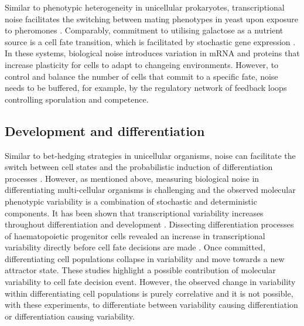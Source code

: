 Similar to phenotypic heterogeneity in unicellular prokaryotes, transcriptional noise facilitates the switching between mating phenotypes in yeast upon exposure to pheromones \citep{Paliwal2007}. 
Comparably, commitment to utilising galactose as a nutrient source is a cell fate transition, which is facilitated by stochastic gene expression \cite{Acar2008}. \\

In these systems, biological noise introduces variation in mRNA and proteins that increase plasticity for cells to adapt to changeing environments.
However, to control and balance the number of cells that commit to a specific fate, noise needs to be buffered, for example, by the regulatory network of feedback loops controlling sporulation and competence.

\subsection{Development and differentiation}

Similar to bet-hedging strategies in unicellular organisms, noise can facilitate the switch between cell states and the probabilistic induction of differentiation processes \citep{Eldar2010, Chang2008}.
However, as mentioned above, measuring biological noise in differentiating multi-cellular organisms is challenging and the observed molecular phenotypic variability is a combination of stochastic and deterministic components.
It has been shown that transcriptional variability increases throughout differentiation \citep{Stumpf2017} and development \citep{Antolovic2017}. 
Dissecting differentiation processes of haematopoietic progenitor cells revealed an increase in transcriptional variability directly before cell fate decisions are made \citep{Mojtahedi2016, Richard2016}. 
Once committed, differentiating cell populations collapse in variability and move towards a new attractor state. 
These studies highlight a possible contribution of molecular variability to cell fate decision event.
However, the observed change in variability within differentiating cell populations is purely correlative and it is not possible, with these experiments, to differentiate between variability causing differentiation or differentiation causing variability.\\

